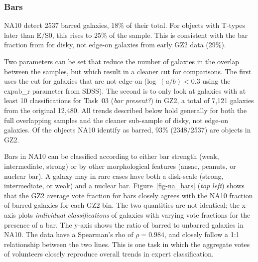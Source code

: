 \documentclass[useAMS,usenatbib]{mn2e}
\begin{document}
\subsubsection{Bars}

NA10 detect 2537 barred galaxies, 18\% of their total. For objects with T-types later than E/S0, this rises to 25\% of the sample. This is consistent with the bar fraction from \citep{mas11c} for disky, not edge-on galaxies from early GZ2 data (29\%). 

Two parameters can be set that reduce the number of galaxies in the overlap between the samples, but which result in a cleaner cut for comparisons. The first uses the \citet{mas11c} cut for galaxies that are not edge-on (log~$(a/b) < 0.3$ using the {\sc expab\_r} parameter from SDSS). The second is to only look at galaxies with at least 10 classifications for Task~03 ({\it bar present?}) in GZ2, a total of 7,121 galaxies from the original 12,480. All trends described below hold generally for both the full overlapping samples and the cleaner sub-sample of disky, not edge-on galaxies. Of the objects NA10 identify as barred, 93\% (2348/2537) are objects in GZ2. 

Bars in NA10 can be classified according to either bar strength (weak, intermediate, strong) or by other morphological features (ansae, peanuts, or nuclear bar). A galaxy may in rare cases have both a disk-scale (strong, intermediate, or weak) and a nuclear bar. Figure~\ref{fig-na_bars} ({\it top left}) shows that the GZ2 average vote fraction for bars closely agrees with the NA10 fraction of barred galaxies for each GZ2 bin. The two quantities are not identical; the x-axis plots {\it individual classifications} of galaxies with varying vote fractions for the presence of a bar. The y-axis shows the ratio of barred to unbarred galaxies in NA10. The data have a Spearman's rho of $\rho=0.984$, and closely follow a 1:1 relationship between the two lines. This is one task in which the aggregate votes of volunteers closely reproduce overall trends in expert classification. 
\end{document}
